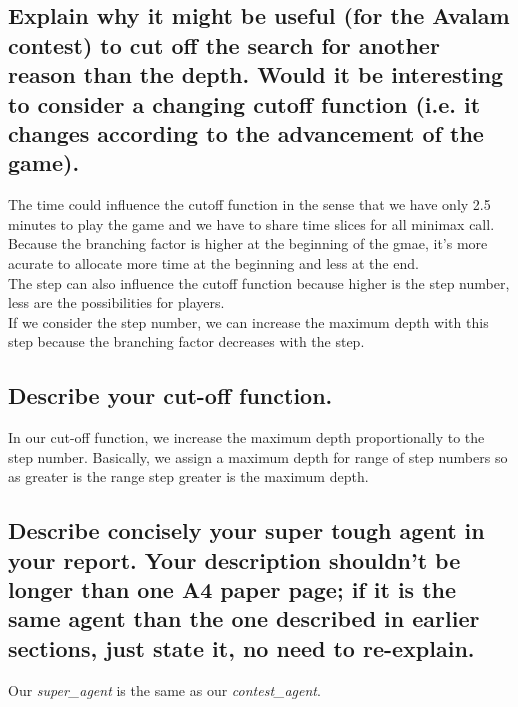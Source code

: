 \documentclass[10pt,a4paper]{article}
\begin{document}
\subsection{Explain why it might be useful (for the Avalam contest) to cut off the search for another reason than the depth. Would it be interesting to consider a changing cutoff function (i.e. it changes according to the advancement of the game).}

The time could influence the cutoff function in the sense that we have only 2.5 minutes to play the game and we have to share time slices for all minimax call. Because the branching factor is higher at the beginning of the gmae, it's more acurate to allocate more time at the beginning and less at the end.\\

The step can also influence the cutoff function because higher is the step number, less are the possibilities for players. \\
If we consider the step number, we can increase the maximum depth with this step because the branching factor decreases with the step.


\subsection{Describe your cut-off function.}

In our cut-off function, we increase the maximum depth proportionally to the step number. Basically, we assign a maximum depth for range of step numbers so as greater is the range step greater is the maximum depth.

\subsection{Describe concisely your super tough agent in your report. Your description shouldn’t be longer than one A4 paper page; if it is the same agent than the one described in earlier sections, just state it, no need to re-explain.}

Our \textit{super\_agent} is the same as our \textit{contest\_agent}.
\end{document}
